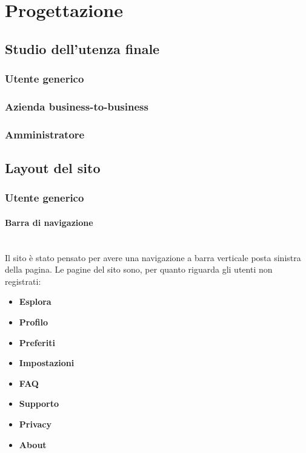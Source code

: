 \newpage
\section{Progettazione}
\subsection{Studio dell'utenza finale}
\subsubsection{Utente generico}

\subsubsection{Azienda business-to-business}

\subsubsection{Amministratore}


\subsection{Layout del sito}

\subsubsection{Utente generico}

\paragraph{Barra di navigazione}
~\\Il sito è stato pensato per avere una navigazione a barra verticale posta sinistra della pagina. Le pagine del sito sono, per quanto riguarda gli utenti non registrati:
\begin{itemize}
	\item \textbf{Esplora}
	\item \textbf{Profilo}
	\item \textbf{Preferiti}
	\item \textbf{Impostazioni}
	\item \textbf{FAQ}
	\item \textbf{Supporto}
	\item \textbf{Privacy}
	\item \textbf{About}
\end{itemize}

